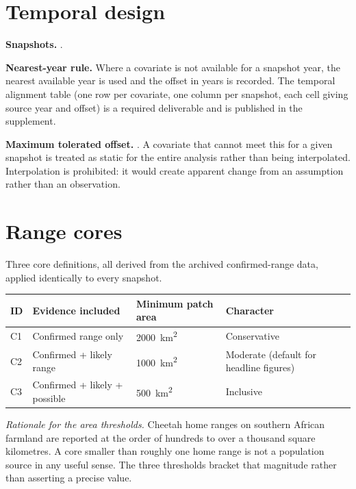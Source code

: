\section{Temporal design}

\textbf{Snapshots.} .

\textbf{Nearest-year rule.} Where a covariate is not available for a snapshot
year, the nearest available year is used and the offset in years is recorded.
The temporal alignment table (one row per covariate, one column per snapshot,
each cell giving source year and offset) is a required deliverable and is
published in the supplement.

\textbf{Maximum tolerated offset.} . A covariate that cannot
meet this for a given snapshot is treated as static for the entire analysis
rather than being interpolated. Interpolation is prohibited: it would create
apparent change from an assumption rather than an observation.

\section{Range cores}

Three core definitions, all derived from the archived confirmed-range data,
applied identically to every snapshot.

\begin{center}
\begin{tabular}{@{}llll@{}}
\toprule
ID & Evidence included & Minimum patch area & Character \\
\midrule
C1 & Confirmed range only & \SI{2000}{\kilo\metre\squared} & Conservative \\
C2 & Confirmed + likely range & \SI{1000}{\kilo\metre\squared} & Moderate (default for headline figures) \\
C3 & Confirmed + likely + possible & \SI{500}{\kilo\metre\squared} & Inclusive \\
\bottomrule
\end{tabular}
\end{center}

\emph{Rationale for the area thresholds.} Cheetah home ranges on southern
African farmland are reported at the order of hundreds to over a thousand square
kilometres. A core smaller than roughly one home range is not a population
source in any useful sense. The three thresholds bracket that magnitude rather
than asserting a precise value.

